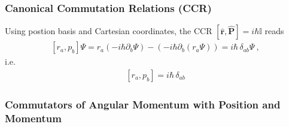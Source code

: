 \documentclass[letterpaper,10pt,english]{jupyterBook}
\begin{document}
\subsubsection{Canonical Commutation Relations (CCR)}
\label{\detokenize{ch/quantum-mechanics/atom-models/schrodinger-notes:canonical-commutation-relations-ccr}}
\sphinxAtStartPar
Using postion basis and Cartesian coordinates, the CCR \([ \hat{\mathbf{r}}, \hat{\mathbf{P}} ] = i \hbar \mathbb{I}\) reads
\begin{equation*}
\begin{split}[r_a, p_b] \Psi = r_a (-i\hbar \partial_b \Psi) - (-i\hbar \partial_b (r_a \Psi)) = i\hbar \, \delta_{ab} \Psi \ ,\end{split}
\end{equation*}
\sphinxAtStartPar
i.e.
\begin{equation*}
\begin{split}[r_a, p_b] = i\hbar \, \delta_{ab}\end{split}
\end{equation*}

\subsubsection{Commutators of Angular Momentum with Position and Momentum}
\label{\detokenize{ch/quantum-mechanics/atom-models/schrodinger-notes:commutators-of-angular-momentum-with-position-and-momentum}}
\end{document}
